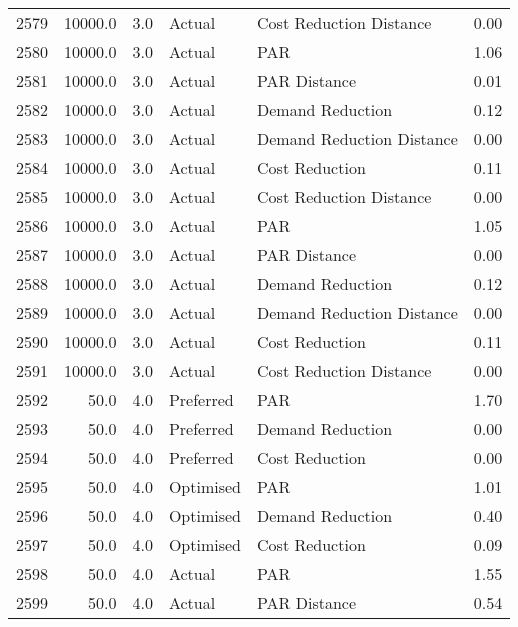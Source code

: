 \begin{longtable}{lrrllr}
2579 &      10000.0 &     3.0 &         Actual &    Cost Reduction Distance &   0.00 \\
2580 &      10000.0 &     3.0 &         Actual &                        PAR &   1.06 \\
2581 &      10000.0 &     3.0 &         Actual &               PAR Distance &   0.01 \\
2582 &      10000.0 &     3.0 &         Actual &           Demand Reduction &   0.12 \\
2583 &      10000.0 &     3.0 &         Actual &  Demand Reduction Distance &   0.00 \\
2584 &      10000.0 &     3.0 &         Actual &             Cost Reduction &   0.11 \\
2585 &      10000.0 &     3.0 &         Actual &    Cost Reduction Distance &   0.00 \\
2586 &      10000.0 &     3.0 &         Actual &                        PAR &   1.05 \\
2587 &      10000.0 &     3.0 &         Actual &               PAR Distance &   0.00 \\
2588 &      10000.0 &     3.0 &         Actual &           Demand Reduction &   0.12 \\
2589 &      10000.0 &     3.0 &         Actual &  Demand Reduction Distance &   0.00 \\
2590 &      10000.0 &     3.0 &         Actual &             Cost Reduction &   0.11 \\
2591 &      10000.0 &     3.0 &         Actual &    Cost Reduction Distance &   0.00 \\
2592 &         50.0 &     4.0 &      Preferred &                        PAR &   1.70 \\
2593 &         50.0 &     4.0 &      Preferred &           Demand Reduction &   0.00 \\
2594 &         50.0 &     4.0 &      Preferred &             Cost Reduction &   0.00 \\
2595 &         50.0 &     4.0 &      Optimised &                        PAR &   1.01 \\
2596 &         50.0 &     4.0 &      Optimised &           Demand Reduction &   0.40 \\
2597 &         50.0 &     4.0 &      Optimised &             Cost Reduction &   0.09 \\
2598 &         50.0 &     4.0 &         Actual &                        PAR &   1.55 \\
2599 &         50.0 &     4.0 &         Actual &               PAR Distance &   0.54 \\

\end{longtable}

